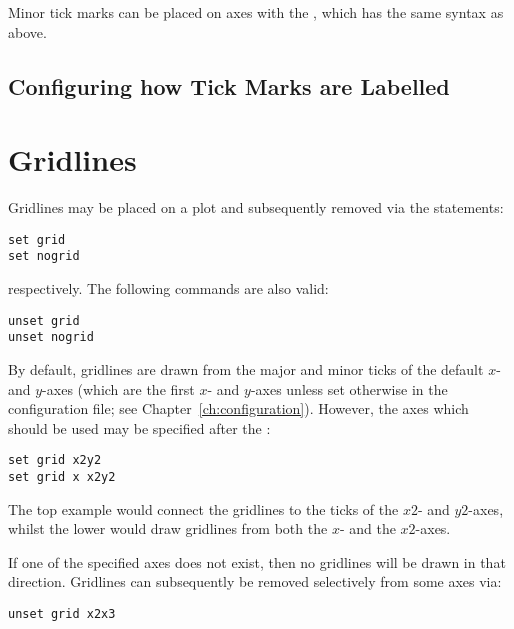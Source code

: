 
Minor tick marks can be placed on axes with the , which has
the same syntax as above.

\subsection{Configuring how Tick Marks are Labelled}

\section{Gridlines}

Gridlines may be placed on a plot and subsequently removed via the statements:

\begin{verbatim}
set grid
set nogrid
\end{verbatim}

\noindent respectively. The following commands are also valid:

\begin{verbatim}
unset grid
unset nogrid
\end{verbatim}

\noindent By default, gridlines are drawn from the major and minor ticks of the
default $x$- and $y$-axes (which are the first $x$- and $y$-axes unless set
otherwise in the configuration file; see Chapter~\ref{ch:configuration}).
However, the axes which should be used may be specified after the :

\begin{verbatim}
set grid x2y2
set grid x x2y2
\end{verbatim}

\noindent The top example would connect the gridlines to the ticks of the $x2$-
and $y2$-axes, whilst the lower would draw gridlines from both the $x$- and the
$x2$-axes.

If one of the specified axes does not exist, then no gridlines will be drawn in
that direction.  Gridlines can subsequently be removed selectively from some
axes via:

\begin{verbatim}
unset grid x2x3
\end{verbatim}

